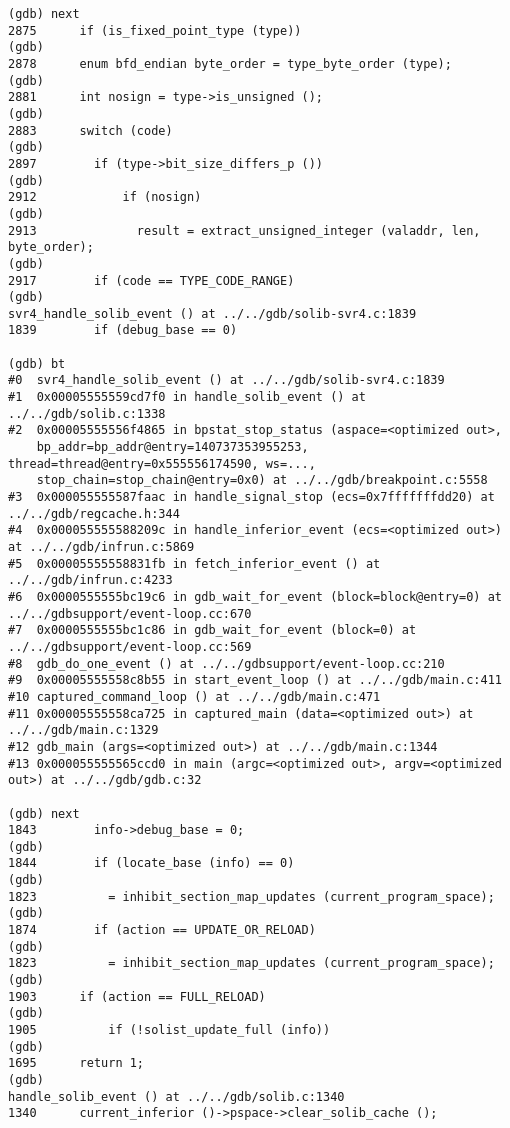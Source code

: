 \documentclass{report}
\begin{document}
\begin{verbatim}
(gdb) next
2875	  if (is_fixed_point_type (type))
(gdb) 
2878	  enum bfd_endian byte_order = type_byte_order (type);
(gdb) 
2881	  int nosign = type->is_unsigned ();
(gdb) 
2883	  switch (code)
(gdb) 
2897		if (type->bit_size_differs_p ())
(gdb) 
2912		    if (nosign)
(gdb) 
2913		      result = extract_unsigned_integer (valaddr, len, byte_order);
(gdb) 
2917		if (code == TYPE_CODE_RANGE)
(gdb) 
svr4_handle_solib_event () at ../../gdb/solib-svr4.c:1839
1839	    if (debug_base == 0)

(gdb) bt
#0  svr4_handle_solib_event () at ../../gdb/solib-svr4.c:1839
#1  0x00005555559cd7f0 in handle_solib_event () at ../../gdb/solib.c:1338
#2  0x00005555556f4865 in bpstat_stop_status (aspace=<optimized out>, 
    bp_addr=bp_addr@entry=140737353955253, thread=thread@entry=0x555556174590, ws=..., 
    stop_chain=stop_chain@entry=0x0) at ../../gdb/breakpoint.c:5558
#3  0x000055555587faac in handle_signal_stop (ecs=0x7fffffffdd20) at ../../gdb/regcache.h:344
#4  0x000055555588209c in handle_inferior_event (ecs=<optimized out>) at ../../gdb/infrun.c:5869
#5  0x00005555558831fb in fetch_inferior_event () at ../../gdb/infrun.c:4233
#6  0x0000555555bc19c6 in gdb_wait_for_event (block=block@entry=0) at ../../gdbsupport/event-loop.cc:670
#7  0x0000555555bc1c86 in gdb_wait_for_event (block=0) at ../../gdbsupport/event-loop.cc:569
#8  gdb_do_one_event () at ../../gdbsupport/event-loop.cc:210
#9  0x00005555558c8b55 in start_event_loop () at ../../gdb/main.c:411
#10 captured_command_loop () at ../../gdb/main.c:471
#11 0x00005555558ca725 in captured_main (data=<optimized out>) at ../../gdb/main.c:1329
#12 gdb_main (args=<optimized out>) at ../../gdb/main.c:1344
#13 0x000055555565ccd0 in main (argc=<optimized out>, argv=<optimized out>) at ../../gdb/gdb.c:32

(gdb) next
1843	    info->debug_base = 0;
(gdb) 
1844	    if (locate_base (info) == 0)
(gdb) 
1823	      = inhibit_section_map_updates (current_program_space);
(gdb) 
1874	    if (action == UPDATE_OR_RELOAD)
(gdb) 
1823	      = inhibit_section_map_updates (current_program_space);
(gdb) 
1903	  if (action == FULL_RELOAD)
(gdb) 
1905	      if (!solist_update_full (info))
(gdb) 
1695	  return 1;
(gdb) 
handle_solib_event () at ../../gdb/solib.c:1340
1340	  current_inferior ()->pspace->clear_solib_cache ();


\end{verbatim}
\end{document}
